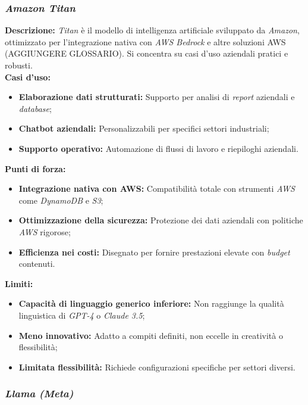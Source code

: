 \subsubsection{\textit{Amazon Titan}}

\noindent \textbf{Descrizione:}
\textit{Titan} è il modello di intelligenza artificiale sviluppato da \textit{Amazon}, ottimizzato per l’integrazione nativa con \textit{AWS Bedrock} e altre soluzioni AWS (AGGIUNGERE GLOSSARIO).
Si concentra su casi d’uso aziendali pratici e robusti.\\

\noindent \textbf{Casi d’uso:}
\begin{itemize}
    \item \textbf{Elaborazione dati strutturati:} Supporto per analisi di \textit{report} aziendali e \textit{database};
    \item \textbf{Chatbot aziendali:} Personalizzabili per specifici settori industriali;
    \item \textbf{Supporto operativo:} Automazione di flussi di lavoro e riepiloghi aziendali.
\end{itemize}

\noindent \textbf{Punti di forza:}
\begin{itemize}
    \item \textbf{Integrazione nativa con AWS:} Compatibilità totale con strumenti \textit{AWS} come \textit{DynamoDB} e \textit{S3};
    \item \textbf{Ottimizzazione della sicurezza:} Protezione dei dati aziendali con politiche \textit{AWS} rigorose;
    \item \textbf{Efficienza nei costi:} Disegnato per fornire prestazioni elevate con \textit{budget} contenuti.
\end{itemize}

\noindent \textbf{Limiti:}
\begin{itemize}
    \item \textbf{Capacità di linguaggio generico inferiore:} Non raggiunge la qualità linguistica di \textit{GPT-4} o \textit{Claude 3.5};
    \item \textbf{Meno innovativo:} Adatto a compiti definiti, non eccelle in creatività o flessibilità;
    \item \textbf{Limitata flessibilità:} Richiede configurazioni specifiche per settori diversi.
\end{itemize}

\vspace{1.5cm}
\subsubsection{\textit{Llama (Meta)}}

